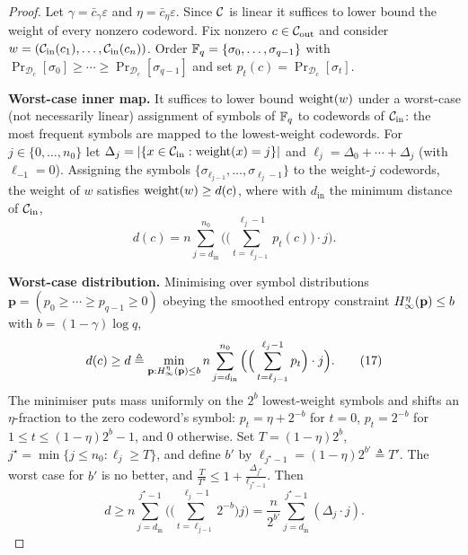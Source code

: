 \begin{proof}
  Let $\gamma = \bar c_\gamma\varepsilon$ and $\eta = \bar c_\eta\varepsilon$.
  Since $\mathcal{C}$ is linear it suffices to lower bound the weight of every nonzero
  codeword. Fix nonzero $c \in \mathcal{C}_{\mathrm{out}}$ and consider
  $w = (\mathcal{C}_{\mathrm{in}}(c_1),\dots,\mathcal{C}_{\mathrm{in}}(c_n))$. Order $\mathbb{F}_q = \{\sigma_0,\dots,\sigma_{q-1}\}$
  with $\Pr_{\mathcal{D}_c}[\sigma_0]\geq\cdots\geq\Pr_{\mathcal{D}_c}[\sigma_{q-1}]$
  and set $p_t(c) = \Pr_{\mathcal{D}_c}[\sigma_t]$.

  \textbf{Worst-case inner map.} It suffices to lower bound $\operatorname{weight}(w)$ under a
  worst-case (not necessarily linear) assignment of symbols of $\mathbb{F}_q$ to codewords
  of $\mathcal{C}_{\mathrm{in}}$: the most frequent symbols are mapped to the lowest-weight codewords.
  For $j \in \{0,\dots,n_0\}$ let $\Delta_j = |\{x\in\mathcal{C}_{\mathrm{in}} : \operatorname{weight}(x) = j\}|$ and
  $\ell_j = \Delta_0 + \cdots + \Delta_j$ (with $\ell_{-1} = 0$). Assigning the
  symbols $\{\sigma_{\ell_{j-1}},\dots,\sigma_{\ell_j - 1}\}$ to the weight-$j$
  codewords, the weight of $w$ satisfies $\operatorname{weight}(w)\geq d(c)$, where with $d_{\mathrm{in}}$
  the minimum distance of $\mathcal{C}_{\mathrm{in}}$,
  \begin{equation}
    d(c) = n\sum_{j = d_{\mathrm{in}}}^{n_0}\Big(\Big(\sum_{t=\ell_{j-1}}^{\ell_j-1}
      p_t(c)\Big)\cdot j\Big).
    \tag{16}
  \end{equation}

  \textbf{Worst-case distribution.} Minimising over symbol distributions
  $\mathbf p = (p_0\geq\cdots\geq p_{q-1}\geq 0)$ obeying the smoothed entropy
  constraint $H_\infty^\eta(\mathbf p)\leq b$ with $b = (1-\gamma)\log q$,
  \begin{equation}
    d(c)\geq d \triangleq \min_{\mathbf p : H_\infty^\eta(\mathbf p)\leq b}
      n\sum_{j=d_{\mathrm{in}}}^{n_0}\Big(\Big(\sum_{t=\ell_{j-1}}^{\ell_j-1}p_t\Big)
      \cdot j\Big).
    \tag{17}
  \end{equation}
  The minimiser puts mass uniformly on the $2^b$ lowest-weight symbols and shifts
  an $\eta$-fraction to the zero codeword's symbol:
  $p_t = \eta + 2^{-b}$ for $t = 0$, $p_t = 2^{-b}$ for
  $1 \leq t \leq (1-\eta)2^b - 1$, and $0$ otherwise. Set $T = (1-\eta)2^b$,
  $j^\star = \min\{j \leq n_0 : \ell_j \geq T\}$, and define $b'$ by
  $\ell_{j^\star-1} = (1-\eta)2^{b'} \triangleq T'$. The worst case for $b'$ is no
  better, and $\frac{T}{T'}\leq 1 + \frac{\Delta_{j^\star}}{\ell_{j^\star-1}}$.
  Then
  \begin{equation}
    d\geq n\sum_{j=d_{\mathrm{in}}}^{j^\star-1}\Big(\Big(\sum_{t=\ell_{j-1}}^{\ell_j-1}
      2^{-b}\Big)j\Big) = \frac{n}{2^{b'}}\sum_{j=d_{\mathrm{in}}}^{j^\star-1}
      (\Delta_j\cdot j).
    \tag{18}
  \end{equation}


\end{proof}
